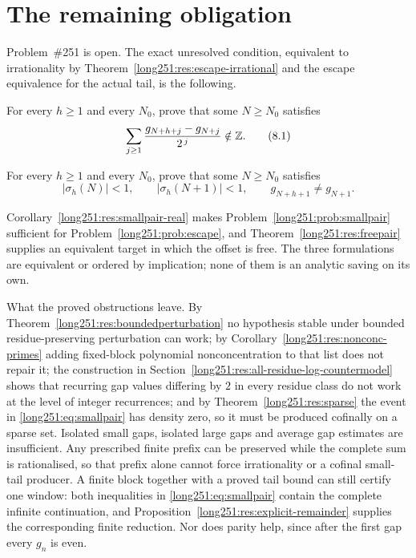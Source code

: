 \documentclass[11pt]{article}
\begin{document}
\section{The remaining obligation}\label{long251:sec:open}

Problem~\#251 is open.  The exact unresolved condition, equivalent to
irrationality by Theorem~\ref{long251:res:escape-irrational} and the escape
equivalence for the actual tail, is the following.

\begin{problem}\label{long251:prob:escape}
For every $h\ge1$ and every $N_0$, prove that some $N\ge N_0$ satisfies
\[
 \sum_{j\ge1}\frac{g_{N+h+j}-g_{N+j}}{2^{\,j}}\notin\mathbb{Z} .
\tag{8.1}\label{long251:eq:shift-escape}
\]
\end{problem}

\begin{problem}\label{long251:prob:smallpair}
For every $h\ge1$ and every $N_0$, prove that some $N\ge N_0$ satisfies
\[
 \bigl|\sigma_h(N)\bigr|<1,\qquad
 \bigl|\sigma_h(N+1)\bigr|<1,\qquad
 g_{N+h+1}\ne g_{N+1} .
\tag{8.2}\label{long251:eq:smallpair}
\]
\end{problem}

Corollary~\ref{long251:res:smallpair-real} makes Problem~\ref{long251:prob:smallpair}
sufficient for Problem~\ref{long251:prob:escape}, and Theorem~\ref{long251:res:freepair}
supplies an equivalent target in which the offset is free.  The three
formulations are equivalent or ordered by implication;
none of them is an analytic saving on its own.

What the proved obstructions leave.  By Theorem~\ref{long251:res:boundedperturbation}
no hypothesis stable under bounded residue-preserving perturbation can work;
by Corollary~\ref{long251:res:nonconc-primes} adding fixed-block polynomial
nonconcentration to that list does not repair it; the construction in
Section~\ref{long251:res:all-residue-log-countermodel} shows that recurring gap
values differing by $2$ in every residue class do not work at the level of
integer recurrences; and by
Theorem~\ref{long251:res:sparse} the event in \eqref{long251:eq:smallpair} has density zero, so
it must be produced cofinally on a sparse set.  Isolated small gaps, isolated
large gaps and average gap estimates are insufficient.  Any prescribed finite
prefix can be preserved while the complete sum is rationalised, so that prefix
alone cannot force irrationality or a cofinal small-tail producer.  A finite
block together with a proved tail bound can still certify one window: both
inequalities in \eqref{long251:eq:smallpair} contain the complete infinite
continuation, and Proposition~\ref{long251:res:explicit-remainder} supplies the
corresponding finite reduction.  Nor does
parity help, since after the first gap every $g_n$ is even.
\end{document}
